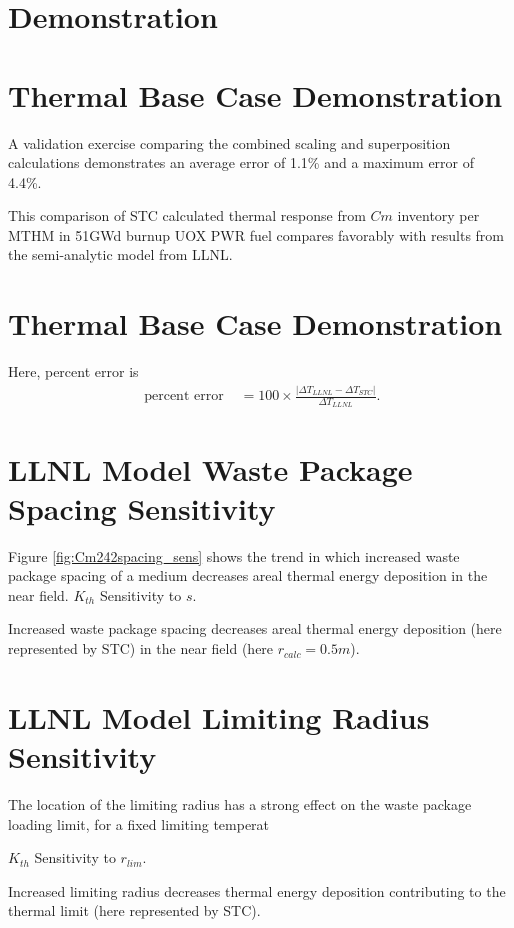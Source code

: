 \documentclass[letterpaper]{article}
\begin{document}
\section{Demonstration}


\begin{frame}[ctb!]
  \section*{Thermal Base Case Demonstration}
A validation exercise comparing the combined scaling and  
superposition calculations demonstrates an average error of 1.1\% and a 
maximum error of 4.4\%.

This comparison of STC calculated thermal response from $Cm$ 
inventory per MTHM in 51GWd burnup UOX PWR fuel compares favorably with results 
from the semi-analytic model from LLNL.


  \section*{Thermal Base Case Demonstration}
Here, percent error is 
\begin{align}
\mbox{ percent error } &= 100\times\frac{\left|\Delta T_{LLNL} - \Delta 
T_{STC}\right|}{ \Delta T_{LLNL}}.
\end{align}


\section*{LLNL Model Waste Package Spacing Sensitivity}
  Figure \ref{fig:Cm242spacing_sens} shows the trend in which increased waste 
  package spacing of a medium decreases areal thermal energy 
  deposition in the near field.
  $K_{th}$ Sensitivity to $s$.
  
  Increased waste package 
  spacing decreases areal thermal energy deposition 
  (here represented by STC) in the near field (here $r_{calc} = 0.5m$).


\section*{LLNL Model Limiting Radius Sensitivity}
  The location of the limiting radius has a strong effect on the 
  waste package loading limit, for a fixed limiting temperat
  
  $K_{th}$ Sensitivity to $r_{lim}$.
  
  Increased limiting radius decreases thermal energy deposition contributing to 
  the thermal limit (here represented by STC).


\end{frame}
\end{document}
